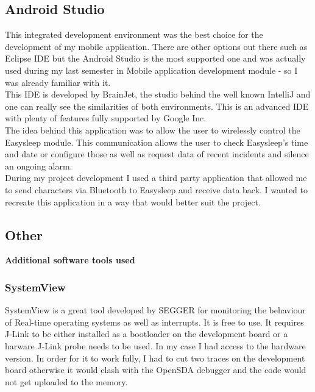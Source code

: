 \documentclass[12pt,a4paper]{article}
\begin{document}
		\subsection{Android Studio} 
		This integrated development environment was the best choice for the development of my mobile application. There are other options out there such as Eclipse IDE but the Android Studio is the most supported one and was actually used during my last semester in Mobile application development module - so I was already familiar with it.\\ 
		
		This IDE is developed by BrainJet, the studio behind the well known IntelliJ and one can really see the similarities of both environments. This is an advanced IDE with plenty of features fully supported by Google Inc.\\ 
		
		The idea behind this application was to allow the user to wirelessly control the Easysleep module. This communication allows the user to check Easysleep's time and date or configure those as well as request data of recent incidents and silence an ongoing alarm.\\
		
		During my project development I used a third party application that allowed me to send characters via Bluetooth to Easysleep and receive data back. I wanted to recreate this application in a way that would better suit the project.\\ 
		\newpage
		
		\subsection{Other}
		{\bfseries Additional software tools used}
		
            \subsubsection{SystemView}
            SystemView is a great tool developed by SEGGER for monitoring the behaviour of Real-time
            operating systems as well as interrupts. It is free to use. It requires J-Link to be either installed as a bootloader on the development board or a harware J-Link probe needs to be used. In my case I had access to the hardware version. In order for it to work fully, I had to cut two traces on the development board otherwise it would clash with the OpenSDA debugger and the code would not get uploaded to the memory.
                    
\end{document}
